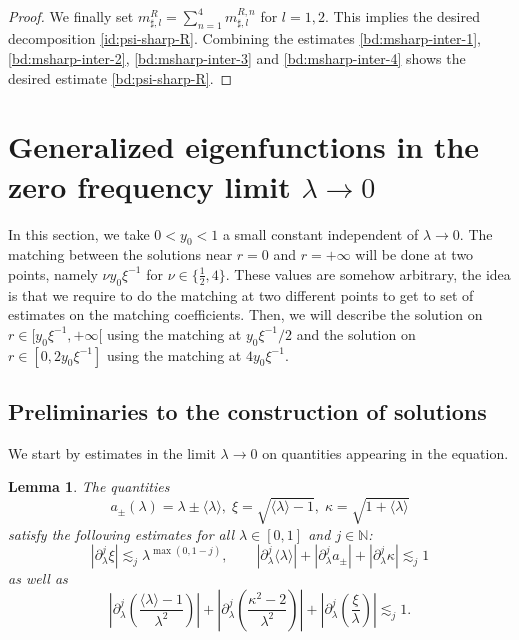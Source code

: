 \documentclass[11 pt]{amsart}
\newtheorem{lem}{Lemma}[section]
\theoremstyle{definition}
\theoremstyle{remark}
\numberwithin{equation}{section}
\begin{document}
\begin{proof}
We finally set $m_{\sharp,l}^R=\sum_{n=1}^4m_{\sharp,l}^{R,n}$ for $l=1,2$. This implies the desired decomposition \eqref{id:psi-sharp-R}. Combining the estimates \eqref{bd:msharp-inter-1}, \eqref{bd:msharp-inter-2}, \eqref{bd:msharp-inter-3} and \eqref{bd:msharp-inter-4} shows the desired estimate \eqref{bd:psi-sharp-R}.

\end{proof}

\section{Generalized eigenfunctions in the zero frequency  limit $\lambda \to 0$}\label{ss29n}

\label{sectionzerofreq}

In this section, we take $0<y_0<1$ a small constant independent of $\lambda \rightarrow 0$. The matching between the solutions near $r=0$ and $r=+\infty$ will be done at two points, namely $\nu y_0 \xi^{-1}$ for $\nu \in \{\frac 12,4\}$. These values are somehow arbitrary, the idea is that we require to do the matching at two different points to get to set of estimates on the matching coefficients. Then, we will describe the solution on $r\in[y_0\xi^{-1},+\infty[$ using the matching at $y_0\xi^{-1}/2$ and the solution on $r \in [0,2y_0\xi^{-1}]$ using the matching at $4y_0\xi^{-1}$.

\subsection{Preliminaries to the construction of solutions}

We start by estimates in the limit $\lambda \rightarrow 0$ on quantities
appearing in the equation.

\begin{lem}
  \label{kast}The quantities
  \[ a_{\pm} (\lambda) = \lambda \pm \langle \lambda \rangle, \; \xi =
     \sqrt{\langle \lambda \rangle - 1}, \; \kappa = \sqrt{1 + \langle \lambda
     \rangle} \]
  satisfy the following estimates for all $\lambda \in [0, 1]$ and $j \in \mathbb{N}$:
$$
| \partial_{\lambda}^j \xi | \lesssim_j \lambda^{\max (0, 1 - j)},
\qquad  | \partial_{\lambda}^j \langle \lambda \rangle | + | \partial_{\lambda}^j a_{\pm} | + | \partial_{\lambda}^j \kappa | \lesssim_j 1
$$
as well as
  \[ \left| \partial_{\lambda}^j \left( \frac{\langle \lambda \rangle -
     1}{\lambda^2} \right) \right| + \left| \partial_{\lambda}^j \left(
     \frac{\kappa^2 - 2}{\lambda^2} \right) \right| + \left|
     \partial_{\lambda}^j \left( \frac{\xi}{\lambda} \right) \right|
     \lesssim_j 1. \]
\end{lem}
\end{document}
